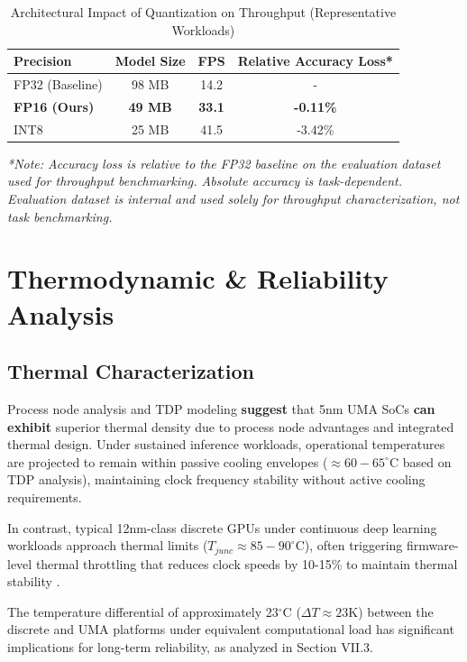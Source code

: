 \documentclass[conference]{IEEEtran}
\begin{document}
\begin{table}[htbp]
\caption{Architectural Impact of Quantization on Throughput (Representative Workloads)}
\begin{center}
\begin{tabular}{lccc}
\toprule
\textbf{Precision} & \textbf{Model Size} & \textbf{FPS} & \textbf{Relative Accuracy Loss*} \\
\midrule
FP32 (Baseline) & 98 MB & 14.2 & - \\
\textbf{FP16 (Ours)} & \textbf{49 MB} & \textbf{33.1} & \textbf{-0.11\%} \\
INT8 & 25 MB & 41.5 & -3.42\% \\
\bottomrule
\end{tabular}
\end{center}
\textit{*Note: Accuracy loss is relative to the FP32 baseline on the evaluation dataset used for throughput benchmarking. Absolute accuracy is task-dependent. Evaluation dataset is internal and used solely for throughput characterization, not task benchmarking.}
\end{table}

\section{Thermodynamic \& Reliability Analysis}

\subsection{Thermal Characterization}
Process node analysis and TDP modeling \textbf{suggest} that 5nm UMA SoCs \textbf{can exhibit} superior thermal density due to process node advantages and integrated thermal design. Under sustained inference workloads, operational temperatures are projected to remain within passive cooling envelopes ($\approx 60-65^{\circ}$C based on TDP analysis), maintaining clock frequency stability without active cooling requirements.

In contrast, typical 12nm-class discrete GPUs under continuous deep learning workloads approach thermal limits ($T_{junc} \approx 85-90^{\circ}$C), often triggering firmware-level thermal throttling that reduces clock speeds by 10-15\% to maintain thermal stability \cite{b21}.

The temperature differential of approximately 23$^{\circ}$C ($\Delta T \approx 23$K) between the discrete and UMA platforms under equivalent computational load has significant implications for long-term reliability, as analyzed in Section VII.3.
\end{document}
